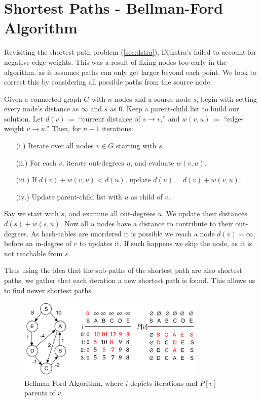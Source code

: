 \section{Shortest Paths - Bellman-Ford Algorithm}
Revisiting the shortest path problem (\ref{sec:dstra}), Dijkstra's failed to 
account for negative edge weights. This was a result of fixing nodes too early in the algorithm,
as it assumes paths can only get larger beyond each point. We look to correct this by considering all possible paths from the source node.
\begin{theo}

    Given a connected graph $G$ with $n$ nodes and a source node $s$, begin with setting 
    every node's distance as $\infty$ and $s$ as 0. Keep a parent-child list to build our solution. Let $d(v):=$ ``current distance of $s\to v$,'' and 
    $w(v,u):=$ ``edge-weight $v\to u$.'' Then, for $n-1$ iterations:
    \begin{enumerate}
        \item [(i.)] Iterate over all nodes $v\in G$ starting with $s$.
        \item [(ii.)] For each $v$, iterate out-degrees $u$, and evaluate $w(v,u)$.
        \item [(iii.)] If $d(v)+w(v,u)<d(u)$, update $d(u)=d(v)+w(v,u)$.
        \item [(iv.)] Update parent-child list with $u$ as child of $v$.
    \end{enumerate}
\end{theo}
\noindent
Say we start with $s$, and examine all out-degrees $u$. We update their distances $d(s)+w(s,u)$. Now all $u$ nodes 
have a distance to contribute to their out-degrees. As hash-tables are unordered it is possible we reach a node $d(v)=\infty$, 
before an in-degree of $v$ to updates it. If such happens we skip the node, as it is not reachable from $s$.

\newpage
\noindent
Thus using the idea that the sub-paths of the shortest path are also shortest paths, we gather that
each iteration a new shortest path is found. This allows us to find newer shortest paths.
\begin{figure}[h]
    \centering
    \includegraphics[width=0.8\textwidth]{Sections/dp/bford.png}
    \caption{Bellman-Ford Algorithm, where $i$ depicts iterations and $P[v]$ parents of $v$.}
    \label{fig:bford}
\end{figure}

